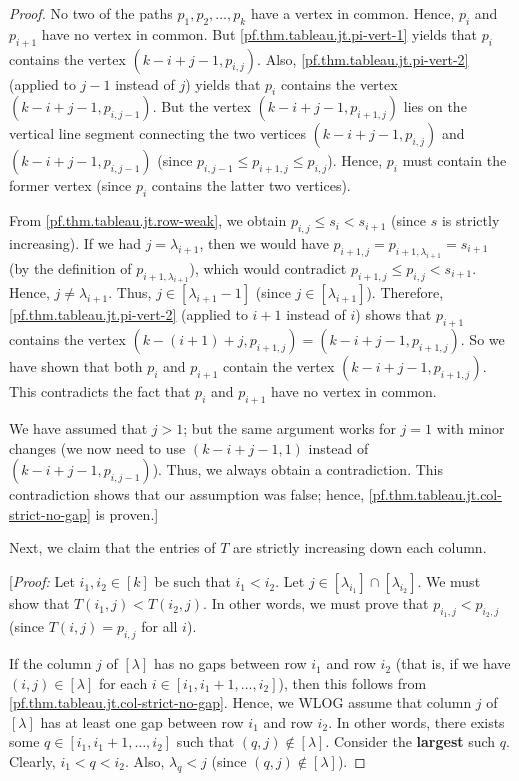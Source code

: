 \documentclass[reqno]{amsart}%
\newcommand{\0}{\phantom{c}}
\theoremstyle{plain}
\theoremstyle{definition}
\numberwithin{equation}{section}
\begin{document}
\begin{proof}
No two of the paths $p_{1},p_{2},\ldots,p_{k}$ have a vertex in common. Hence,
$p_{i}$ and $p_{i+1}$ have no vertex in common. But
\eqref{pf.thm.tableau.jt.pi-vert-1} yields that $p_{i}$ contains the vertex
$\left(  k-i+j-1,p_{i,j}\right)  $. Also, \eqref{pf.thm.tableau.jt.pi-vert-2}
(applied to $j-1$ instead of $j$) yields that $p_{i}$ contains the vertex
$\left(  k-i+j-1,p_{i,j-1}\right)  $. But the vertex $\left(
k-i+j-1,p_{i+1,j}\right)  $ lies on the vertical line segment connecting the
two vertices $\left(  k-i+j-1,p_{i,j}\right)  $ and $\left(  k-i+j-1,p_{i,j-1}%
\right)  $ (since $p_{i,j-1}\leq p_{i+1,j}\leq p_{i,j}$). Hence, $p_{i}$ must
contain the former vertex (since $p_{i}$ contains the latter two vertices).

From \eqref{pf.thm.tableau.jt.row-weak}, we obtain $p_{i,j}\leq s_{i}<s_{i+1}$
(since $s$ is strictly increasing). If we had $j=\lambda_{i+1}$, then we would
have $p_{i+1,j}=p_{i+1,\lambda_{i+1}}=s_{i+1}$ (by the definition of
$p_{i+1,\lambda_{i+1}}$), which would contradict $p_{i+1,j}\leq p_{i,j}%
<s_{i+1}$. Hence, $j\neq\lambda_{i+1}$. Thus, $j\in\left[  \lambda
_{i+1}-1\right]  $ (since $j\in\left[  \lambda_{i+1}\right]  $). Therefore,
\eqref{pf.thm.tableau.jt.pi-vert-2} (applied to $i+1$ instead of $i$) shows
that $p_{i+1}$ contains the vertex $\left(  k-\left(  i+1\right)
+j,p_{i+1,j}\right)  =\left(  k-i+j-1,p_{i+1,j}\right)  $. So we have shown
that both $p_{i}$ and $p_{i+1}$ contain the vertex $\left(  k-i+j-1,p_{i+1,j}%
\right)  $. This contradicts the fact that $p_{i}$ and $p_{i+1}$ have no
vertex in common.

We have assumed that $j>1$; but the same argument works for $j=1$ with minor
changes (we now need to use $\left(  k-i+j-1,1\right)  $ instead of $\left(
k-i+j-1,p_{i,j-1}\right)  $). Thus, we always obtain a contradiction. This
contradiction shows that our assumption was false; hence,
\eqref{pf.thm.tableau.jt.col-strict-no-gap} is proven.]

Next, we claim that the entries of $T$ are strictly increasing down each column.

[\textit{Proof:} Let $i_{1},i_{2}\in\left[  k\right]  $ be such that
$i_{1}<i_{2}$. Let $j\in\left[  \lambda_{i_{1}}\right]  \cap\left[
\lambda_{i_{2}}\right]  $. We must show that $T\left(  i_{1},j\right)
<T\left(  i_{2},j\right)  $. In other words, we must prove that $p_{i_{1}%
,j}<p_{i_{2},j}$ (since $T\left(  i,j\right)  =p_{i,j}$ for all $i$).

If the column $j$ of $\left[  \lambda\right]  $ has no gaps between row
$i_{1}$ and row $i_{2}$ (that is, if we have $\left(  i,j\right)  \in\left[
\lambda\right]  $ for each $i\in\left[  i_{1},i_{1}+1,\ldots,i_{2}\right]  $),
then this follows from \eqref{pf.thm.tableau.jt.col-strict-no-gap}. Hence, we
WLOG assume that column $j$ of $\left[  \lambda\right]  $ has at least one gap
between row $i_{1}$ and row $i_{2}$. In other words, there exists some
$q\in\left[  i_{1},i_{1}+1,\ldots,i_{2}\right]  $ such that $\left(
q,j\right)  \notin\left[  \lambda\right]  $. Consider the \textbf{largest}
such $q$. Clearly, $i_{1}<q<i_{2}$. Also, $\lambda_{q}<j$ (since $\left(
q,j\right)  \notin\left[  \lambda\right]  $).


\end{proof}
\end{document}
